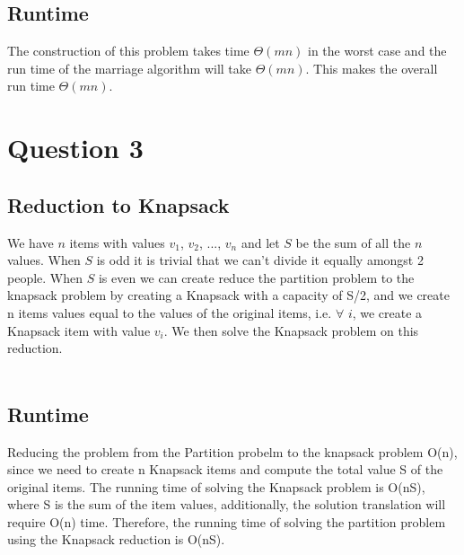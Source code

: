 \documentclass{article}
\begin{document}
\subsection{Runtime}
The construction of this problem takes time $\Theta(mn)$ in the worst case and the run time of the marriage algorithm will take $\Theta(mn)$. This makes the overall run time $\Theta(mn)$.

\section{Question 3}
\subsection{Reduction to Knapsack}
 We have $n$ items with values $v_1$, $v_2$, ..., $v_n$ and let $S$ be the sum of all the $n$ values. When $S$ is odd it is trivial that we can't divide it equally amongst 2 people. When $S$ is even we can create reduce the partition problem to the knapsack problem by creating a Knapsack with a capacity of S/2, and we create n items values equal to the values of the original items, i.e. $\forall$ $i$, we create a Knapsack item with value $v_i$. We then solve the Knapsack problem on this reduction.\\\\

\subsection{Runtime}
Reducing the problem from the Partition probelm to the knapsack problem O(n), since we need to create n Knapsack items and compute the total value S of the original items. The running time of solving the Knapsack problem is O(nS), where S is the sum of the item values, additionally, the solution translation will require O(n) time. Therefore, the  running time of solving the partition problem using the Knapsack reduction is O(nS).
\end{document}
